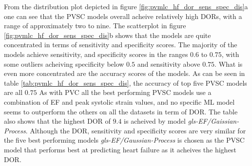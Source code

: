 From the distribution plot depicted in figure \ref{fig:pvmlc_hf_dor_sens_spec_dis}a one can see that the PVSC models overall acheive relatively high DORs, 
with a range of approximately two to nine.
The scatterplot in figure \ref{fig:pvmlc_hf_dor_sens_spec_dis}b shows that the models are quite concentrated in terms of sensitivity and specificity scores. 
The majority of the models achieve sensitivity, and specificity scores in the ranges $0.6$ to $0.75$, with some outliers acheiving specificity below $0.5$ and sensitivity above $0.75$.
What is even more concentrated are the accuracy scores of the models. 
As can be seen in table \ref{tab:pvmlc_hf_dor_sens_spec_dis}, the accuracy of top five PVSC models are all $0.75$
As with PVC all the best performing PVSC models use a combination of EF and peak systolic strain values, 
and no specific ML model seems to outperform the others on all the datasets in term of DOR.
The table also shows that the highest DOR of $9.4$ is acheived by model \textit{gls-EF/Gaissian-Process}. 
Although the DOR, sensitivity and specificity scores are very similar for the five best performing models \textit{gls-EF/Gaussian-Process} 
is chosen as the PVSC model that performs best at predicting heart failure as it acheives the highest DOR.

